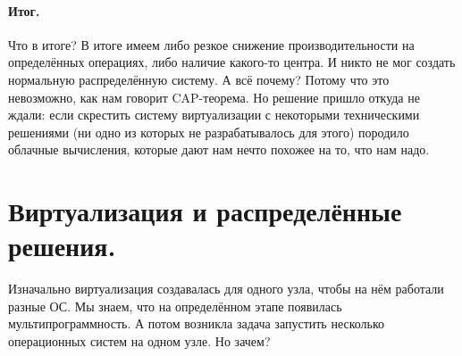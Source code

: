 \documentclass{article}
\begin{document}
    \paragraph{Итог.}
    Что в итоге? В итоге имеем либо резкое снижение производительности на определённых операциях, либо наличие какого-то центра. И никто не мог создать нормальную распределённую систему. А всё почему? Потому что это невозможно, как нам говорит CAP-теорема. Но решение пришло откуда не ждали: если скрестить систему виртуализации с некоторыми техническими решениями (ни одно из которых не разрабатывалось для этого) породило облачные вычисления, которые дают нам нечто похожее на то, что нам надо.
    \section{Виртуализация и распределённые решения.}
    Изначально виртуализация создавалась для одного узла, чтобы на нём работали разные ОС. Мы знаем, что на определённом этапе появилась мультипрограммность. А потом возникла задача запустить несколько операционных систем на одном узле. Но зачем?
\end{document}
